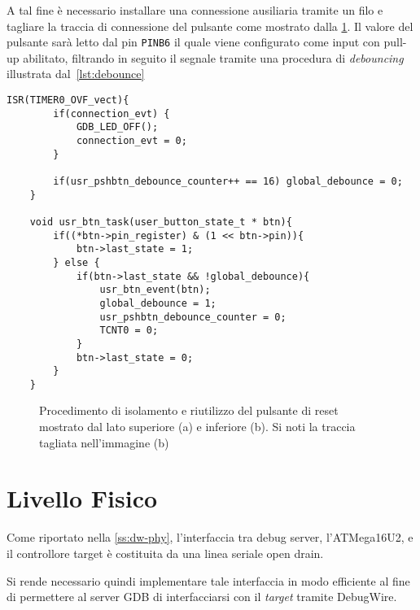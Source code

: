 A tal fine è necessario installare una connessione ausiliaria tramite un filo e tagliare la traccia di connessione del pulsante come mostrato dalla \cref{fig:rst-rewire}. Il valore del pulsante sarà letto dal pin \texttt{PINB6} il quale viene configurato come input con pull-up abilitato, filtrando in seguito il segnale tramite una procedura di \textit{debouncing} illustrata dal~\cref{lst:debounce}

\noindent\begin{minipage}{\textwidth}
    \begin{lstlisting}[style=C, caption={Routine di interrupt di TIMER0 per la gestione del debounce}, label=lst:debounce]
    ISR(TIMER0_OVF_vect){
        if(connection_evt) {
            GDB_LED_OFF();
            connection_evt = 0;
        }
    
        if(usr_pshbtn_debounce_counter++ == 16) global_debounce = 0;
    }

    void usr_btn_task(user_button_state_t * btn){
        if((*btn->pin_register) & (1 << btn->pin)){
            btn->last_state = 1;
        } else {
            if(btn->last_state && !global_debounce){
                usr_btn_event(btn);
                global_debounce = 1;
                usr_pshbtn_debounce_counter = 0;
                TCNT0 = 0;
            }
            btn->last_state = 0;
        }
    }
    \end{lstlisting}
\end{minipage}

\begin{figure}[h]
    \centering
    \hspace{8mm}

    \caption[]{Procedimento di isolamento e riutilizzo del pulsante di reset mostrato dal lato superiore (a) e inferiore (b). Si noti la traccia tagliata nell'immagine (b)}\label{fig:rst-rewire}
\end{figure}

\section{Livello Fisico}

Come riportato nella \cref{ss:dw-phy}, l'interfaccia tra debug server, l'ATMega16U2, e il controllore target è costituita da una linea seriale open drain.

Si rende necessario quindi implementare tale interfaccia in modo efficiente al fine di permettere al server GDB di interfacciarsi con il \textit{target} tramite DebugWire.

